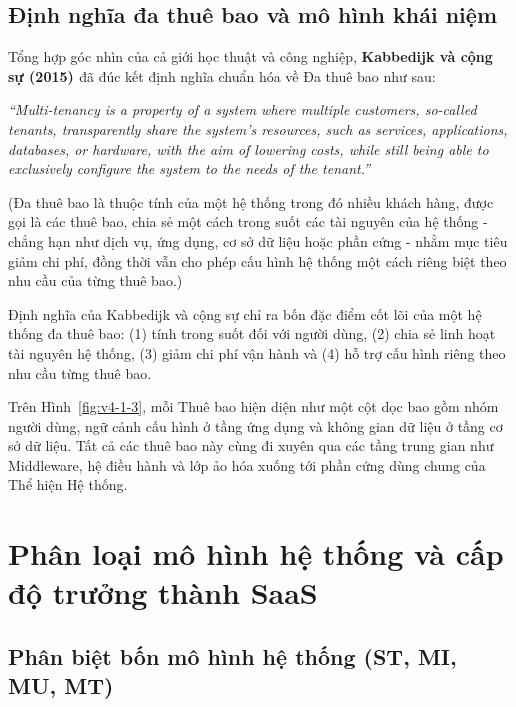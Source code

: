 \subsection{Định nghĩa đa thuê bao và mô hình khái niệm}\label{v4-sec-1-2-4}

Tổng hợp góc nhìn của cả giới học thuật và công nghiệp, \textbf{Kabbedijk và cộng sự (2015) \cite{v4-05}} đã đúc kết định nghĩa chuẩn hóa về Đa thuê bao như sau:

\emph{``Multi-tenancy is a property of a system where multiple customers, so-called tenants, transparently share the system's resources, such as services, applications, databases, or hardware, with the aim of lowering costs, while still being able to exclusively configure the system to the needs of the tenant.''}

(Đa thuê bao là thuộc tính của một hệ thống trong đó nhiều khách hàng, được gọi là các thuê bao, chia sẻ một cách trong suốt các tài nguyên của hệ thống - chẳng hạn như dịch vụ, ứng dụng, cơ sở dữ liệu hoặc phần cứng - nhằm mục tiêu giảm chi phí, đồng thời vẫn cho phép cấu hình hệ thống một cách riêng biệt theo nhu cầu của từng thuê bao.)

Định nghĩa của Kabbedijk và cộng sự \cite{v4-05} chỉ ra bốn đặc điểm cốt lõi của một hệ thống đa thuê bao: (1) tính trong suốt đối với người dùng, (2) chia sẻ linh hoạt tài nguyên hệ thống, (3) giảm chi phí vận hành và (4) hỗ trợ cấu hình riêng theo nhu cầu từng thuê bao.


Trên Hình~\ref{fig:v4-1-3}, mỗi Thuê bao hiện diện như một cột dọc bao gồm nhóm người dùng, ngữ cảnh cấu hình ở tầng ứng dụng và không gian dữ liệu ở tầng cơ sở dữ liệu. Tất cả các thuê bao này cùng đi xuyên qua các tầng trung gian như Middleware, hệ điều hành và lớp ảo hóa xuống tới phần cứng dùng chung của Thể hiện Hệ thống.

\section{Phân loại mô hình hệ thống và cấp độ trưởng thành SaaS}\label{v4-sec-1-3}

\subsection{Phân biệt bốn mô hình hệ thống (ST, MI, MU, MT)}\label{v4-sec-1-3-1}

